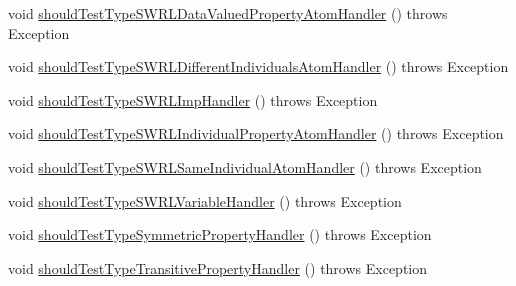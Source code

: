 \begin{DoxyCompactItemize}
\item 
void \hyperlink{classorg_1_1semanticweb_1_1owlapi_1_1contract_1_1_contract_rdfxml_parser_test_af0bbc3392c0f5a61507538d64d659cbe}{should\-Test\-Type\-S\-W\-R\-L\-Data\-Valued\-Property\-Atom\-Handler} ()  throws Exception 
\item 
void \hyperlink{classorg_1_1semanticweb_1_1owlapi_1_1contract_1_1_contract_rdfxml_parser_test_a0ca2f859d3274e2e50ab57e42c168d6f}{should\-Test\-Type\-S\-W\-R\-L\-Different\-Individuals\-Atom\-Handler} ()  throws Exception 
\item 
void \hyperlink{classorg_1_1semanticweb_1_1owlapi_1_1contract_1_1_contract_rdfxml_parser_test_a3af783a623d921ebf9d39fbef9df06cb}{should\-Test\-Type\-S\-W\-R\-L\-Imp\-Handler} ()  throws Exception 
\item 
void \hyperlink{classorg_1_1semanticweb_1_1owlapi_1_1contract_1_1_contract_rdfxml_parser_test_abfd7e5e5bafbd002adb2dffb5067a3bf}{should\-Test\-Type\-S\-W\-R\-L\-Individual\-Property\-Atom\-Handler} ()  throws Exception 
\item 
void \hyperlink{classorg_1_1semanticweb_1_1owlapi_1_1contract_1_1_contract_rdfxml_parser_test_af4175e0400b50b28f2bbcd49c6c1cfef}{should\-Test\-Type\-S\-W\-R\-L\-Same\-Individual\-Atom\-Handler} ()  throws Exception 
\item 
void \hyperlink{classorg_1_1semanticweb_1_1owlapi_1_1contract_1_1_contract_rdfxml_parser_test_ac81ff3eaac31023a9a2741b0a69c0969}{should\-Test\-Type\-S\-W\-R\-L\-Variable\-Handler} ()  throws Exception 
\item 
void \hyperlink{classorg_1_1semanticweb_1_1owlapi_1_1contract_1_1_contract_rdfxml_parser_test_ae8d8195b33c638557c522abdbc258e8f}{should\-Test\-Type\-Symmetric\-Property\-Handler} ()  throws Exception 
\item 
void \hyperlink{classorg_1_1semanticweb_1_1owlapi_1_1contract_1_1_contract_rdfxml_parser_test_a2fe1463850e1e69ac2ae3f86e8a46f42}{should\-Test\-Type\-Transitive\-Property\-Handler} ()  throws Exception 
\end{DoxyCompactItemize}


